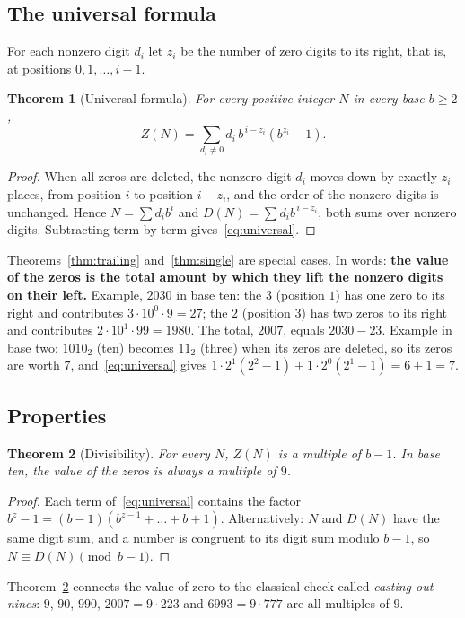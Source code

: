 \documentclass[11pt,a4paper]{article}
\newtheorem{theorem}{Theorem}
\theoremstyle{definition}
\newcommand{\Dz}{D}   %
\newcommand{\Zv}{Z}   %
\begin{document}
\subsection{The universal formula}
For each nonzero digit $d_i$ let $z_i$ be the number of zero digits to its right, that is, at positions $0,1,\dots,i-1$.

\begin{theorem}[Universal formula]\label{thm:universal}
For every positive integer $N$ in every base $b\ge 2$,
\begin{equation}\label{eq:universal}
  \Zv(N) = \sum_{d_i\neq 0} d_i\, b^{\,i-z_i}\left(b^{z_i}-1\right).
\end{equation}
\end{theorem}
\begin{proof}
When all zeros are deleted, the nonzero digit $d_i$ moves down by exactly $z_i$ places, from position $i$ to position $i-z_i$, and the order of the nonzero digits is unchanged. Hence $N=\sum d_i b^i$ and $\Dz(N)=\sum d_i b^{\,i-z_i}$, both sums over nonzero digits. Subtracting term by term gives~\eqref{eq:universal}.
\end{proof}

Theorems~\ref{thm:trailing} and~\ref{thm:single} are special cases. In words: \textbf{the value of the zeros is the total amount by which they lift the nonzero digits on their left.} Example, $2030$ in base ten: the $3$ (position $1$) has one zero to its right and contributes $3\cdot 10^0\cdot 9=27$; the $2$ (position $3$) has two zeros to its right and contributes $2\cdot 10^1\cdot 99=1980$. The total, $2007$, equals $2030-23$. Example in base two: $1010_2$ (ten) becomes $11_2$ (three) when its zeros are deleted, so its zeros are worth $7$, and~\eqref{eq:universal} gives $1\cdot 2^1(2^2-1)+1\cdot 2^0(2^1-1)=6+1=7$.

\subsection{Properties}
\begin{theorem}[Divisibility]\label{thm:div}
For every $N$, $\Zv(N)$ is a multiple of $b-1$. In base ten, the value of the zeros is always a multiple of $9$.
\end{theorem}
\begin{proof}
Each term of~\eqref{eq:universal} contains the factor $b^{z}-1=(b-1)(b^{z-1}+\dots+b+1)$. Alternatively: $N$ and $\Dz(N)$ have the same digit sum, and a number is congruent to its digit sum modulo $b-1$, so $N\equiv \Dz(N)\pmod{b-1}$.
\end{proof}
Theorem~\ref{thm:div} connects the value of zero to the classical check called \emph{casting out nines}: $9$, $90$, $990$, $2007=9\cdot 223$ and $6993=9\cdot 777$ are all multiples of $9$.
\end{document}
